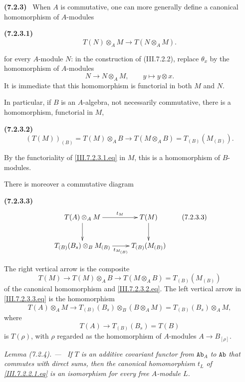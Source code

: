 \documentclass[10pt,oneside]{book}
\newcommand{\cat}[1]{\mathtt{#1}}
\newcommand{\sref}[2][]{(#2)}
\newcommand{\oldpage}[2][]{\setcounter{footnote}{0}\marginpar{\scriptsize\textbf{#1}~|~#2}\ignorespaces}
\newenvironment{env}[1][]{\par\medskip\noindent\textbf{(#1)}\ }{\par}
\newenvironment{lemma}[1][]{\par\medskip\noindent\itshape Lemma (#1). ---\ }{\par}
\begin{document}
\begin{env}[7.2.3]
\label{III.7.2.3}
When $A$ is commutative, one can more generally define a
canonical homomorphism of $A$-modules
\begin{env}[7.2.3.1]
\label{III.7.2.3.1}
\[
  T(N)\otimes_A M
  \longrightarrow
  T(N\otimes_A M).
  \tag{7.2.3.1}\label{III.7.2.3.1.eq}
\]
\end{env}
for every $A$-module $N$: in the construction of
\sref{III.7.2.2}, replace $\theta_x$ by the homomorphism of
$A$-modules
\[
  N\longrightarrow N\otimes_A M,
  \qquad
  y\longmapsto y\otimes x.
\]
It is immediate that this homomorphism is functorial in both
$M$ and $N$.

\oldpage[III]{178}
In particular, if $B$ is an $A$-algebra, not necessarily
commutative, there is a homomorphism, functorial in $M$,
\begin{env}[7.2.3.2]
\label{III.7.2.3.2}
\[
  (T(M))_{(B)}
  =
  T(M)\otimes_A B
  \longrightarrow
  T(M\otimes_A B)
  =
  T_{(B)}(M_{(B)}).
  \tag{7.2.3.2}\label{III.7.2.3.2.eq}
\]
\end{env}
By the functoriality of \eqref{III.7.2.3.1.eq} in $M$, this is
a homomorphism of $B$-modules.

There is moreover a commutative diagram
\begin{env}[7.2.3.3]
\label{III.7.2.3.3}
\[
\xymatrix{
  T(A)\otimes_A M
    \ar[r]^-{t_M}\ar[d]
  & T(M)\ar[d]
  \\
  T_{(B)}(B_s)\otimes_B M_{(B)}
    \ar[r]_-{t_{M_{(B)}}}
  & T_{(B)}(M_{(B)})
}
\tag{7.2.3.3}\label{III.7.2.3.3.eq}
\]
\end{env}
The right vertical arrow is the composite
\[
  T(M)
  \longrightarrow
  T(M)\otimes_A B
  \longrightarrow
  T(M\otimes_A B)
  =
  T_{(B)}(M_{(B)})
\]
of the canonical homomorphism and
\eqref{III.7.2.3.2.eq}.  The left vertical arrow in
\eqref{III.7.2.3.3.eq} is the homomorphism
\[
  T(A)\otimes_A M
  \longrightarrow
  T_{(B)}(B_s)\otimes_B(B\otimes_A M)
  =
  T_{(B)}(B_s)\otimes_A M,
\]
where
\[
  T(A)\longrightarrow T_{(B)}(B_s)=T(B)
\]
is $T(\rho)$, with $\rho$ regarded as the homomorphism of
$A$-modules $A\to B_{[\rho]}$.
\end{env}

\begin{lemma}[7.2.4]
\label{III.7.2.4}
If $T$ is an additive covariant functor from $\cat{Ab}_A$ to
$\cat{Ab}$ that commutes with direct sums, then the canonical
homomorphism $t_L$ of \eqref{III.7.2.2.1.eq} is an isomorphism
for every free $A$-module $L$.
\end{lemma}
\end{document}
